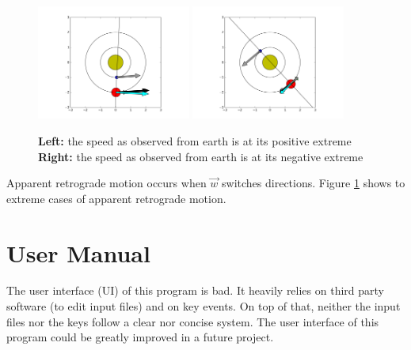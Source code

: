 \documentclass[a4paper,onesided,10pt]{article}
\begin{document}
\begin{figure}[h!]
	\centering
		\includegraphics[width=0.45\textwidth]{adding.png}
		\includegraphics[width=0.45\textwidth]{subtracting.png}
	\caption{\textbf{Left:} the speed as observed from earth is at its positive extreme \hspace{\textwidth}
	\textbf{Right:} the speed as observed from earth is at its negative extreme}
	\label{fig:adding}
\end{figure}

Apparent retrograde motion occurs when $\vec{w}$ switches directions. Figure \ref{fig:adding} shows to extreme cases of apparent retrograde motion.


\section{User Manual}
The user interface (UI) of this program is bad. It heavily relies on third party software (to edit input files) and on key events. On top of that, neither the input files nor the keys follow a clear nor concise system. The user interface of this program could be greatly improved in a future project.
\end{document}
